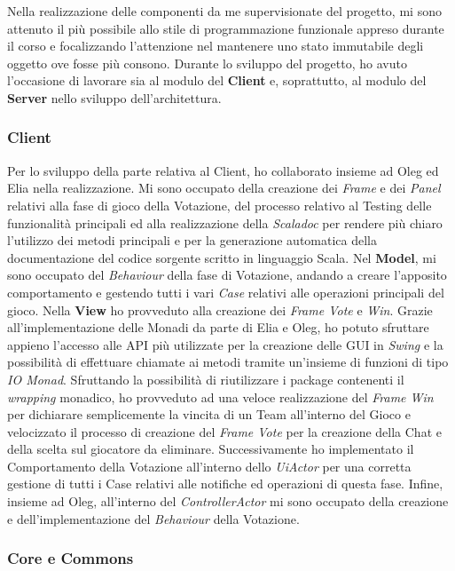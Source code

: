 Nella realizzazione delle componenti da me supervisionate del progetto, mi sono attenuto il pi\`u possibile allo stile di programmazione funzionale appreso durante il corso e focalizzando l'attenzione nel mantenere uno stato immutabile degli oggetto ove fosse pi\`u consono. Durante lo sviluppo del progetto, ho avuto l'occasione di lavorare sia al modulo del \textbf{Client} e, soprattutto, al modulo del \textbf{Server} nello sviluppo dell'architettura.

\subsubsection{Client}

Per lo sviluppo della parte relativa al Client, ho collaborato insieme ad Oleg ed Elia nella realizzazione. Mi sono occupato della creazione dei \textit{Frame} e dei \textit{Panel} relativi alla fase di gioco della Votazione, del processo relativo al Testing delle funzionalit\`a principali ed alla realizzazione della \textit{Scaladoc} per rendere pi\`u chiaro l'utilizzo dei metodi principali e per la generazione automatica della documentazione del codice sorgente scritto in linguaggio Scala. Nel \textbf{Model}, mi sono occupato del \textit{Behaviour} della fase di Votazione, andando a creare l'apposito comportamento e gestendo tutti i vari \textit{Case} relativi alle operazioni principali del gioco. Nella \textbf{View} ho provveduto alla creazione dei \textit{Frame Vote} e \textit{Win}. Grazie all'implementazione delle Monadi da parte di Elia e Oleg, ho potuto sfruttare appieno l'accesso alle API pi\`u utilizzate per la creazione delle GUI in \textit{Swing} e la possibilit\`a di effettuare chiamate ai metodi tramite un'insieme di funzioni di tipo \textit{IO Monad}. Sfruttando la possibilit\`a di riutilizzare i package contenenti il \textit{wrapping} monadico, ho provveduto ad una veloce realizzazione del \textit{Frame Win} per dichiarare semplicemente la vincita di un Team all'interno del Gioco e velocizzato il processo di creazione del \textit{Frame Vote} per la creazione della Chat e della scelta sul giocatore da eliminare. Successivamente ho implementato il Comportamento della Votazione all'interno dello \textit{UiActor} per una corretta gestione di tutti i Case relativi alle notifiche ed operazioni di questa fase. Infine, insieme ad Oleg, all'interno del \textit{ControllerActor} mi sono occupato della creazione e dell'implementazione del \textit{Behaviour} della Votazione.

\subsubsection{Core e Commons}

